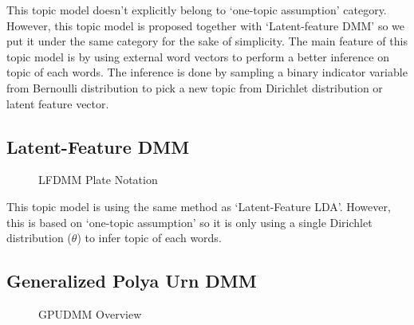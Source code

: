 \documentclass[senior]{IPSstyle}
\begin{document}
This topic model doesn’t explicitly belong to ‘one-topic assumption’ category. However, this topic model is proposed together with ‘Latent-feature DMM’ so we put it under the same category for the sake of simplicity. The main feature of this topic model is by using external word vectors to perform a better inference on topic of each words. The inference is done by sampling a binary indicator variable from Bernoulli distribution to pick a new topic from Dirichlet distribution or latent feature vector.

\subsection{Latent-Feature DMM~\cite{nguyen}}

\begin{figure}[h]
	\centering
	\caption{LFDMM Plate Notation}
\label{fig_lfdmm}
\end{figure}

This topic model is using the same method as ‘Latent-Feature LDA’. However, this is based on ‘one-topic assumption’ so it is only using a single Dirichlet distribution ($\theta$) to
infer topic of each words.

\subsection{Generalized Polya Urn DMM~\cite{li}}

\begin{figure}[h]
	\centering
	\caption{GPUDMM Overview}
\label{fig_gpudmm}
\end{figure}
\end{document}
